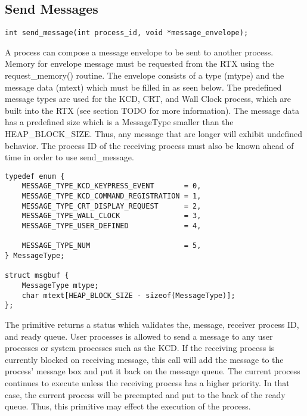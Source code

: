\documentclass[12pt]{report}
\begin{document}
\subsection{Send Messages}
\label{sec:send_message}
\begin{lstlisting}
int send_message(int process_id, void *message_envelope);
\end{lstlisting}

\par A process can compose a message envelope to be sent to another process. Memory for envelope message must be requested from the RTX using the request\_memory() routine. The envelope consists of a type (mtype) and the message data (mtext) which must be filled in as seen below. The predefined message types are used for the KCD, CRT, and Wall Clock process, which are built into the RTX (see section TODO for more information). The message data has a predefined size which is a MessageType smaller than the HEAP\_BLOCK\_SIZE. Thus, any message that are longer will exhibit undefined behavior. The process ID of the receiving process must also be known ahead of time in order to use send\_message.
\newline

\begin{lstlisting}
typedef enum {
    MESSAGE_TYPE_KCD_KEYPRESS_EVENT       = 0,
    MESSAGE_TYPE_KCD_COMMAND_REGISTRATION = 1,
    MESSAGE_TYPE_CRT_DISPLAY_REQUEST      = 2,
    MESSAGE_TYPE_WALL_CLOCK               = 3,
    MESSAGE_TYPE_USER_DEFINED             = 4,

    MESSAGE_TYPE_NUM                      = 5,
} MessageType;

struct msgbuf {
    MessageType mtype;
    char mtext[HEAP_BLOCK_SIZE - sizeof(MessageType)];
};
\end{lstlisting}
\par The primitive returns a status which validates the, message, receiver process ID, and ready queue. User processes is allowed to send a message to any user processes or system processes such as the KCD. If the receiving process is currently blocked on receiving message, this call will add the message to the process' message box and put it back on the message queue. The current process continues to execute unless the receiving process has a higher priority. In that case, the current process will be preempted and put to the back of the ready queue. Thus, this primitive may effect the execution of the process.
\newline
\end{document}
